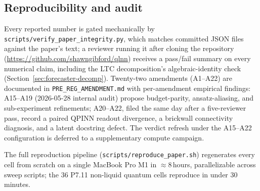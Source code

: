 \subsection{Reproducibility and audit}
\label{sec:discussion-reproducibility}

Every reported number is gated mechanically by
\texttt{scripts/verify\_paper\_integrity.py}, which matches
committed JSON files against the paper's text; a reviewer running
it after cloning the repository
(\url{https://github.com/shawngibford/qlnn}) receives a
pass/fail summary on every numerical claim, including the LTC
decomposition's algebraic-identity check
(Section~\ref{sec:forecaster-decomp}). Twenty-two amendments
(A1--A22) are documented in \texttt{PRE\_REG\_AMENDMENT.md} with
per-amendment empirical findings: A15--A19 (2026-05-28 internal
audit) propose budget-parity, ansatz-aliasing, and
sub-experiment refinements; A20--A22, filed the same day after a
five-reviewer pass, record a paired QPINN readout divergence, a
brickwall connectivity diagnosis, and a latent docstring defect.
The verdict refresh under the A15--A22 configuration is deferred
to a supplementary compute campaign.

The full reproduction pipeline
(\texttt{scripts/reproduce\_paper.sh}) regenerates every cell
from scratch on a single MacBook Pro M1 in $\approx 8$\,hours,
parallelizable across sweep scripts; the 36 P7.11 non-liquid
quantum cells reproduce in under 30 minutes.
